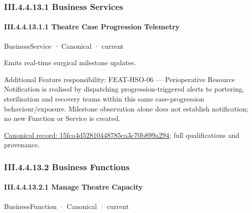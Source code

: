\subsubsection*{III.4.4.13.1 Business Services}
\label{navigation:III.4.4.13.1}

\paragraph*{III.4.4.13.1.1 Theatre Case Progression Telemetry}
\label{navigation:III.4.4.13.1.1}

\label{element:15fca4d52810448785ca3c70b899a294}
{\small BusinessService · Canonical · current}\par

Emits real-time surgical milestone updates.



Additional Feature responsibility: FEAT-HSO-06 — Perioperative Resource Notification is realised by dispatching progression-triggered alerts to portering, sterilisation and recovery teams within this same case-progression behaviour/exposure. Milestone observation alone does not establish notification; no new Function or Service is created.


{\footnotesize \href{../../../../../../../continuum/business/business-service/15fca4d52810448785ca3c70b899a294.md}{Canonical record: 15fca4d52810448785ca3c70b899a294}; full qualifications and provenance.}\par
\subsubsection*{III.4.4.13.2 Business Functions}
\label{navigation:III.4.4.13.2}

\paragraph*{III.4.4.13.2.1 Manage Theatre Capacity}
\label{navigation:III.4.4.13.2.1}

\label{element:3566d549770f490dba823fe3b0421446}
{\small BusinessFunction · Canonical · current}\par

